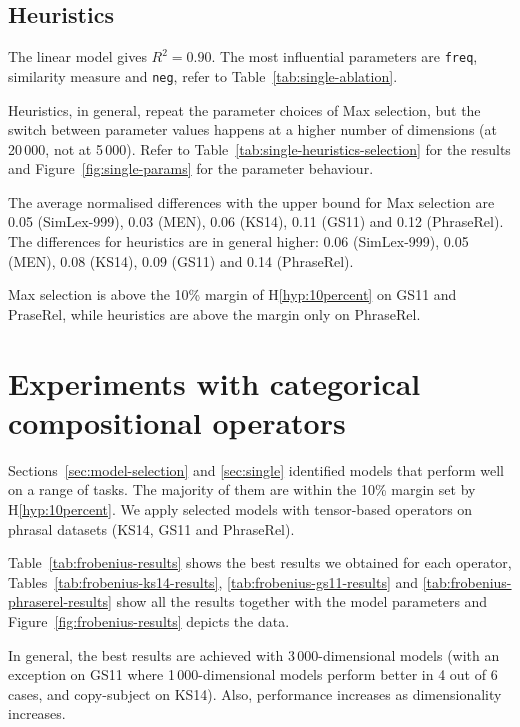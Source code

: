 \subsection{Heuristics}
\label{sec:heuristics-single}



The linear model gives $R^2 = 0.90$. The most influential parameters are \texttt{freq}, similarity measure and \texttt{neg}, refer to Table~\ref{tab:single-ablation}.

Heuristics, in general, repeat the parameter choices of Max selection, but the switch between parameter values happens at a higher number of dimensions (at 20\,000, not at 5\,000). Refer to Table~\ref{tab:single-heuristics-selection} for the results and Figure~\ref{fig:single-params} for the parameter behaviour.

The average normalised differences with the upper bound for Max selection are 0.05 (SimLex-999), 0.03 (MEN), 0.06 (KS14), 0.11 (GS11) and 0.12 (PhraseRel). The differences for heuristics are in general higher: 0.06 (SimLex-999), 0.05 (MEN), 0.08 (KS14), 0.09 (GS11) and 0.14 (PhraseRel).

Max selection is above the 10\% margin of H\ref{hyp:10percent} on GS11 and PraseRel, while heuristics are above the margin only on PhraseRel.

\section{Experiments with categorical compositional operators}
\label{sec:frob-comp-oper}

Sections~\ref{sec:model-selection} and \ref{sec:single} identified models that perform well on a range of tasks. The majority of them are within the 10\% margin set by H\ref{hyp:10percent}. We apply selected models with tensor-based operators on phrasal datasets (KS14, GS11 and PhraseRel).



Table~\ref{tab:frobenius-results} shows the best results we obtained for each operator, Tables~\ref{tab:frobenius-ks14-results}, \ref{tab:frobenius-gs11-results} and \ref{tab:frobenius-phraserel-results} show all the results together with the model parameters and Figure~\ref{fig:frobenius-results} depicts the data.

In general, the best results are achieved with 3\,000-dimensional models (with an exception on GS11 where 1\,000-dimensional models perform better in 4 out of 6 cases, and copy-subject on KS14). Also, performance increases as dimensionality increases.


